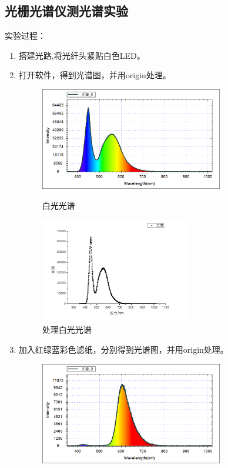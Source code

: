 \documentclass[11pt]{article}
\begin{document}
\subsection{光栅光谱仪测光谱实验}
\noindent 实验过程：
\begin{enumerate}
    \item 搭建光路,将光纤头紧贴白色LED。
    \item 打开软件，得到光谱图，并用origin处理。
    \begin{figure}[H]
        \centering
        \begin{minipage}[t]{0.55\linewidth}
            \centering
            \includegraphics[width=8cm]{Fig/18.png}
            \caption{白光光谱}
        \end{minipage}
        \begin{minipage}[t]{0.44\linewidth}
            \centering
            \includegraphics[width=6.5cm]{Fig/19.png}
            \caption{处理白光光谱}
        \end{minipage}
    \end{figure}
    \item 加入红绿蓝彩色滤纸，分别得到光谱图，并用origin处理。
    \begin{figure}[H]
        \centering
        \begin{minipage}[t]{0.55\linewidth}
            \centering
            \includegraphics[width=8cm]{Fig/20-红.png}

\end{minipage}
\end{figure}
\end{enumerate}
\end{document}

